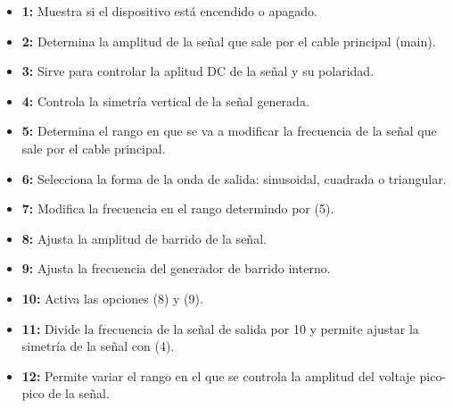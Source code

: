 \documentclass{scrartcl}
\begin{document}
\begin{itemize}
	\item \textbf{1:} Muestra si el dispositivo está encendido o apagado.
	\item \textbf{2:} Determina la amplitud de la señal que sale por el cable principal (main).
	\item \textbf{3:} Sirve para controlar la aplitud DC de la señal y su polaridad.
	\item \textbf{4:} Controla la simetría vertical de la señal generada.
	\item \textbf{5:} Determina el rango en que se va a modificar la frecuencia de la señal que sale por el cable principal.
	\item \textbf{6:} Selecciona la forma de la onda de salida: sinusoidal, cuadrada o triangular.
	\item \textbf{7:} Modifica la frecuencia en el rango determindo por (5).
	\item \textbf{8:} Ajusta la amplitud de barrido de la señal.
	\item \textbf{9:} Ajusta la frecuencia del generador de barrido interno.
	\item \textbf{10:} Activa las opciones (8) y (9).
	\item \textbf{11:} Divide la frecuencia de la señal de salida por 10 y permite ajustar la simetría de la señal con (4).
	\item \textbf{12:} Permite variar el rango en el que se controla la amplitud del voltaje pico-pico de la señal.




\end{itemize}
	
	
\end{document}
